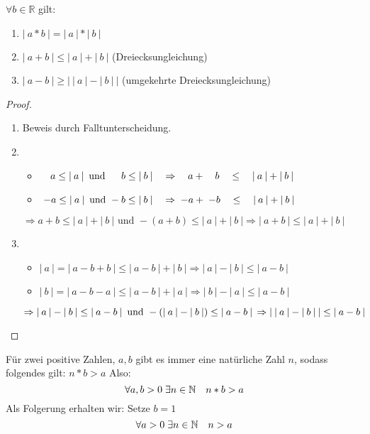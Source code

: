 \documentclass[a4paper,titlepage,oneside]{article}
\def\N{\ensuremath{\mathbb{N}} }
\def\R{\ensuremath{\mathbb{R}} }
\def\fa{\ensuremath{\forall}}
\def\ex{\ensuremath{\exists}}
\def\sp{\hspace{0,1cm}}
\newcommand{\abs}[1]{\ensuremath{\left|\:#1\:\right|}}
\theoremstyle{thmstyle}
\begin{document}
\begin{subsatz}
\(\fa b \in \R\) gilt:
\begin{enumerate}[label=(\arabic*)]
	\item \(\abs{a * b} = \abs{a} * \abs{b}\)
	\item \(\abs{a + b} \le \abs{a} + \abs{b}\) (Dreiecksungleichung)
	\item \(\abs{a - b} \ge \abs{\abs{a} - \abs{b}}\) (umgekehrte Dreiecksungleichung)
\end{enumerate}
\begin{proof}\sp
\begin{enumerate}[label=(\arabic*)]
	\item Beweis durch Falltunterscheidung.
	\item \begin{itemize}
		\item \(\quad a \le \abs{a} \text{ und } \sp \quad b \le \abs{b} \quad \Rightarrow \quad a + \quad b \quad\le\quad \abs{a}+\abs{b} \)
		\item \(\sp-a \le \abs{a} \text{ und } -b \le \abs{b} \quad \Rightarrow \sp -a + \sp -b \quad\le\quad \abs{a} +\abs{b} \)
		\end{itemize}
		\(\Rightarrow a + b \le \abs{a} + \abs{b} \text{ und } -(a + b) \le \abs{a} + \abs{b} \Rightarrow \abs{a + b} \le \abs{a} + \abs{b} \)
	\item \begin{itemize}
		\item \(\abs{a} = \abs{a - b + b} \le \abs{a - b} + \abs{b} \Rightarrow \abs{a} - \abs{b} \le \abs{a-b}\)
		\item \(\abs{b} = \abs{a - b - a} \le \abs{a - b} + \abs{a} \Rightarrow \abs{b} - \abs{a} \le \abs{a-b}\)
		\end{itemize}
		\(\Rightarrow \abs{a} - \abs{b} \le \abs{a-b} \text{ und } - (\abs{a} - \abs{b}) \le \abs{a-b} \\
	\Rightarrow \abs{\abs{a} - \abs{b}} \le \abs{a-b}\)
\end{enumerate}
\end{proof}
\end{subsatz}

\begin{subbem}
Für zwei positive Zahlen, \(a, b\) gibt es immer eine natürliche Zahl $n$, sodass folgendes gilt: \(n * b > a\) Also:
\[\fa a,b > 0 \sp \ex n \in \N \quad n * b > a\]
Als Folgerung erhalten wir: Setze \(b = 1\)
\[\fa a > 0 \sp \ex n \in \N \quad n > a\]
\end{subbem}
\end{document}
